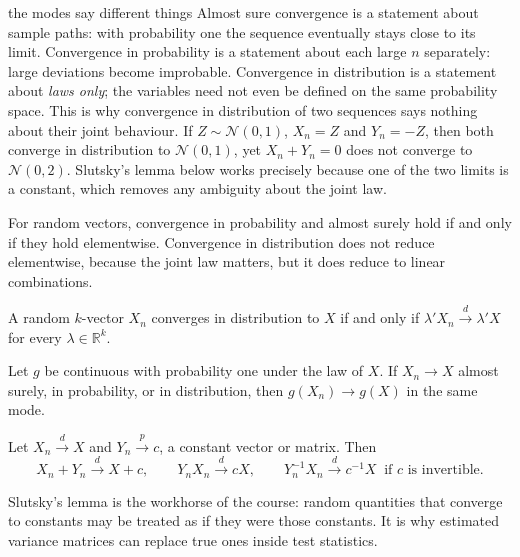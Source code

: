 \documentclass[11pt,a4paper]{article}
\newcommand{\R}{\mathbb{R}}
\newcommand{\N}{\mathcal{N}}
\newcommand{\cp}{\xrightarrow{\;p\;}}
\newcommand{\cd}{\xrightarrow{\;d\;}}
\begin{document}
\begin{whybox}{the modes say different things}
Almost sure convergence is a statement about sample paths: with probability one the sequence eventually stays close to its limit. Convergence in probability is a statement about each large $n$ separately: large deviations become improbable. Convergence in distribution is a statement about \emph{laws only}; the variables need not even be defined on the same probability space. This is why convergence in distribution of two sequences says nothing about their joint behaviour. If $Z\sim\N(0,1)$, $X_n=Z$ and $Y_n=-Z$, then both converge in distribution to $\N(0,1)$, yet $X_n+Y_n=0$ does not converge to $\N(0,2)$. Slutsky's lemma below works precisely because one of the two limits is a constant, which removes any ambiguity about the joint law.
\end{whybox}

For random vectors, convergence in probability and almost surely hold if and only if they hold elementwise. Convergence in distribution does not reduce elementwise, because the joint law matters, but it does reduce to linear combinations.

\begin{proposition}
A random $k$-vector $X_n$ converges in distribution to $X$ if and only if $\lambda'X_n\cd\lambda'X$ for every $\lambda\in\R^k$.
\end{proposition}

\begin{proposition}
Let $g$ be continuous with probability one under the law of $X$. If $X_n\to X$ almost surely, in probability, or in distribution, then $g(X_n)\to g(X)$ in the same mode.
\end{proposition}

\begin{proposition}[Slutsky]
Let $X_n\cd X$ and $Y_n\cp c$, a constant vector or matrix. Then
\[
X_n+Y_n\cd X+c,\qquad Y_nX_n\cd cX,\qquad Y_n^{-1}X_n\cd c^{-1}X\ \text{ if $c$ is invertible.}
\]
\end{proposition}

Slutsky's lemma is the workhorse of the course: random quantities that converge to constants may be treated as if they were those constants. It is why estimated variance matrices can replace true ones inside test statistics.
\end{document}
